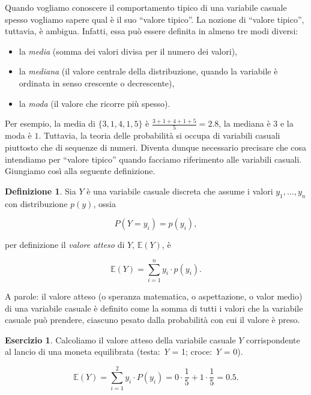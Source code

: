 \documentclass[
  11pt,
]{krantz}
\providecommand{\tightlist}{%
  \setlength{\itemsep}{0pt}\setlength{\parskip}{0pt}}
\newcommand{\E}{\mathbb{E}} %
\theoremstyle{definition}
\newtheorem{definition}{Definizione}[chapter]
\theoremstyle{definition}
\theoremstyle{definition}
\newtheorem{exercise}{Esercizio}[chapter]
\theoremstyle{definition}
\theoremstyle{remark}
\begin{document}
Quando vogliamo conoscere il comportamento tipico di una variabile casuale spesso vogliamo sapere qual è il suo ``valore tipico''. La nozione di ``valore tipico'', tuttavia, è ambigua. Infatti, essa può essere definita in almeno tre modi diversi:

\begin{itemize}
\tightlist
\item
  la \emph{media} (somma dei valori divisa per il numero dei valori),
\item
  la \emph{mediana} (il valore centrale della distribuzione, quando la variabile è ordinata in senso crescente o decrescente),
\item
  la \emph{moda} (il valore che ricorre più spesso).
\end{itemize}

Per esempio, la media di \(\{3, 1, 4, 1, 5\}\) è \(\frac{3+1+4+1+5}{5} = 2.8\), la mediana è \(3\) e la moda è \(1\). Tuttavia, la teoria delle probabilità si occupa di variabili casuali piuttosto che di sequenze di numeri. Diventa dunque necessario precisare che cosa intendiamo per ``valore tipico'' quando facciamo riferimento alle variabili casuali. Giungiamo così alla seguente definizione.

\begin{definition}
Sia \(Y\) è una variabile casuale discreta che assume i valori \(y_1, \dots, y_n\) con distribuzione \(p(y)\), ossia

\[
P(Y = y_i) = p(y_i),
\]

per definizione il \emph{valore atteso} di \(Y\), \(\E(Y)\), è

\begin{equation}
\E(Y) = \sum_{i=1}^n y_i \cdot p(y_i).
\label{eq:expval-discr}
\end{equation}
\end{definition}

A parole: il valore atteso (o speranza matematica, o aspettazione, o valor medio) di una variabile casuale è definito come la somma di tutti i valori che la variabile casuale può prendere, ciascuno pesato dalla probabilità con cui il valore è preso.

\begin{exercise}
Calcoliamo il valore atteso della variabile casuale \(Y\) corrispondente al lancio di una moneta equilibrata (testa: \emph{Y} = 1; croce: \emph{Y} = 0).

\[
\E(Y) = \sum_{i=1}^{2} y_i \cdot P(y_i) = 0 \cdot \frac{1}{5} + 1 \cdot \frac{1}{5} = 0.5.
\]
\end{exercise}
\end{document}
